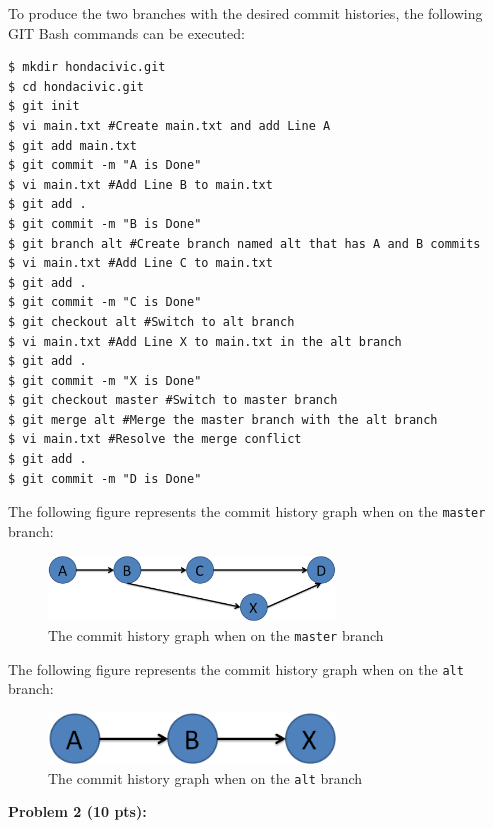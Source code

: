 \documentclass[12pt]{article}
\begin{document}
\noindent To produce the two branches with the desired commit histories, the following GIT Bash commands can be executed:
\begin{lstlisting}
$ mkdir hondacivic.git
$ cd hondacivic.git
$ git init
$ vi main.txt #Create main.txt and add Line A
$ git add main.txt
$ git commit -m "A is Done"
$ vi main.txt #Add Line B to main.txt
$ git add .
$ git commit -m "B is Done"
$ git branch alt #Create branch named alt that has A and B commits
$ vi main.txt #Add Line C to main.txt
$ git add .
$ git commit -m "C is Done"
$ git checkout alt #Switch to alt branch
$ vi main.txt #Add Line X to main.txt in the alt branch
$ git add .
$ git commit -m "X is Done"
$ git checkout master #Switch to master branch
$ git merge alt #Merge the master branch with the alt branch
$ vi main.txt #Resolve the merge conflict
$ git add .
$ git commit -m "D is Done"
\end{lstlisting}  

\noindent The following figure represents the commit history graph when on the \texttt{master} branch:

\begin{figure}[h!]
\begin{center}
\includegraphics[width=3in]{Master.png}
\end{center}
\caption{The commit history graph when on the \texttt{master} branch}
\end{figure}

\noindent The following figure represents the commit history graph when on the \texttt{alt} branch:

\begin{figure}[h!]
\begin{center}
\includegraphics[width=3in]{Alt.png}
\end{center}
\caption{The commit history graph when on the \texttt{alt} branch}
\end{figure}

\newpage
\noindent\textbf{Problem 2 (10 pts):}
\end{document}
